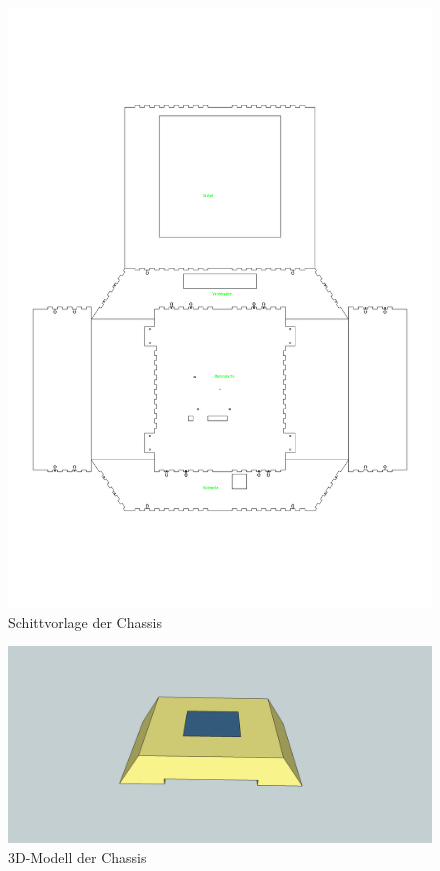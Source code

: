 \documentclass[a4paper,bibtotoc,oneside]{scrbook}
\begin{document}
\begin{figure}[htbp]
\centering
\includegraphics[width=125mm]{img/gehause.pdf}
\caption[Chassis]{Schittvorlage der Chassis}\label{gehause}
\end{figure}

\begin{figure}[htbp]
\centering
\includegraphics[width=125mm]{img/robo3d.png}
\caption[Chassis]{3D-Modell der Chassis}\label{robo3d}
\end{figure}
\end{document}
